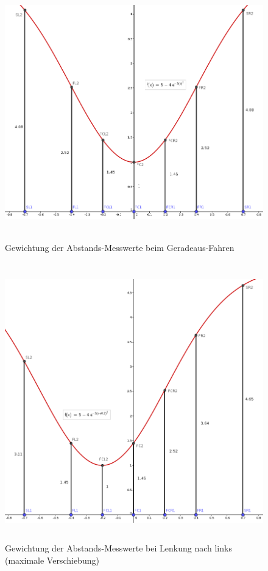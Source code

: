 \documentclass[12pt, a4paper]{scrartcl}
\begin{document}
\begin{figure}[ht]
	\centering
	\includegraphics[width=\textwidth, height=11cm, keepaspectratio]{Bilder/Gauss_Sensorgewichtung_gerade.png}
	\caption{Gewichtung der Abstands-Messwerte beim Geradeaus-Fahren}
	\label{img:gaussian-weighted-dist-straight}
\end{figure}

\begin{figure}[ht]
	\centering
	\includegraphics[width=\textwidth, height=12cm, keepaspectratio]{Bilder/Gauss_Sensorgewichtung_geneigt.png}
	\caption{Gewichtung der Abstands-Messwerte bei Lenkung nach links (maximale Verschiebung)}
	\label{img:gaussian-weighted-dist-curve}
\end{figure}
\end{document}
